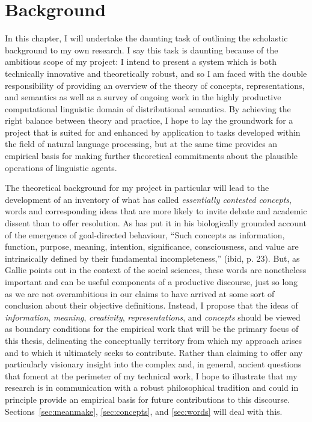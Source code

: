 \chapter{Background}
In this chapter, I will undertake the daunting task of outlining the scholastic background to my own research.  I say this task is daunting because of the ambitious scope of my project: I intend to present a system which is both technically innovative and theoretically robust, and so I am faced with the double responsibility of providing an overview of the theory of concepts, representations, and semantics as well as a survey of ongoing work in the highly productive computational linguistic domain of distributional semantics.  By achieving the right balance between theory and practice, I hope to lay the groundwork for a project that is suited for and enhanced by application to tasks developed within the field of natural language processing, but at the same time provides an empirical basis for making further theoretical commitments about the plausible operations of linguistic agents.

The theoretical background for my project in particular will lead to the development of an inventory of what \cite{Gallie1956} has called \emph{essentially contested concepts}, words and corresponding ideas that are more likely to invite debate and academic dissent than to offer resolution.  As \cite{Deacon2011} has put it in his biologically grounded account of the emergence of goal-directed behaviour, ``Such concepts as information, function, purpose, meaning, intention, significance, consciousness, and value are intrinsically defined by their fundamental incompleteness,'' (ibid, p. 23).  But, as Gallie points out in the context of the social sciences, these words are nonetheless important and can be useful components of a productive discourse, just so long as we are not overambitious in our claims to have arrived at some sort of conclusion about their objective definitions.  Instead, I propose that the ideas of \emph{information}, \emph{meaning}, \emph{creativity}, \emph{representations}, and \emph{concepts} should be viewed as boundary conditions for the empirical work that will be the primary focus of this thesis, delineating the conceptually territory from which my approach arises and to which it ultimately seeks to contribute.  Rather than claiming to offer any particularly visionary insight into the complex and, in general, ancient questions that foment at the perimeter of my technical work, I hope to illustrate that my research is in communication with a robust philosophical tradition and could in principle provide an empirical basis for future contributions to this discourse.  Sections~\ref{sec:meanmake}, \ref{sec:concepts}, and \ref{sec:words} will deal with this.

